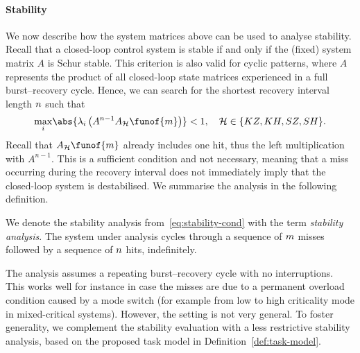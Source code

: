 \paragraph*{Stability}%

We now describe how the system matrices above can be used to analyse stability. 
Recall that a closed-loop control system is stable if and only if the (fixed) system matrix $A$ is Schur stable. 
This criterion is also valid for cyclic patterns, where $A$ represents the product of all closed-loop state matrices experienced in a full burst--recovery cycle. 
Hence, we can search for the shortest recovery interval length $n$ such that
%
\begin{equation}
\label{eq:stability-cond}
    \underset{i}{\max}{\abs{\eig{i}{A^{\numhits-1}A_{\strat}\funof{\nummisses}}}} < 1, \quad \strat \in  \{ KZ, KH, SZ, SH \}.
\end{equation}
%
Recall that $A_{\strat}\funof{m}$ already includes one hit, thus the left multiplication with $A^{n-1}$. 
This is a sufficient condition and not necessary, meaning that a miss occurring during the recovery interval does not immediately imply that the closed-loop system is destabilised. 
We summarise the analysis in the following definition.

\begin{definition}%
    We denote the stability analysis from~\eqref{eq:stability-cond} with the term \emph{\nilsstability{} stability analysis}.
    The system under analysis cycles through a sequence of $m$ misses followed by a sequence of $n$ hits, indefinitely.
\end{definition}
%
The \nilsstability{} analysis assumes a repeating burst--recovery cycle with no interruptions.
This works well for instance in case the misses are due to a permanent overload condition caused by a mode switch (for example from low to high criticality mode in mixed-critical systems).
However, the setting is not very general.
To foster generality, we complement the stability evaluation with a less restrictive stability analysis, based on the proposed task model in Definition~\ref{def:task-model}.

